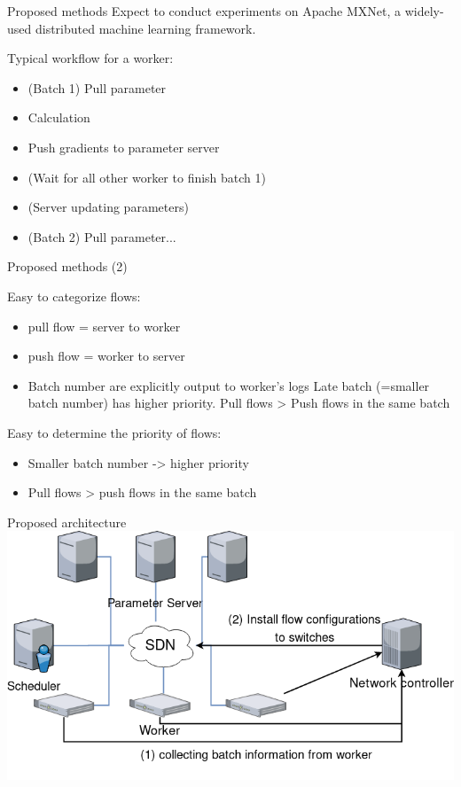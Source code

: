\documentclass{beamer}
\begin{document}
\begin{frame}{Proposed methods}
Expect to conduct experiments on Apache MXNet\footnotemark, a widely-used distributed machine learning framework.

Typical workflow for a worker:
\begin{itemize}
    \item (Batch 1) Pull parameter
    \item Calculation
    \item Push gradients to parameter server
    \item (Wait for all other worker to finish batch 1)
    \item (Server updating parameters)
    \item (Batch 2) Pull parameter...
\end{itemize}

\end{frame}

\begin{frame}{Proposed methods (2)}

Easy to categorize flows:
\begin{itemize}
    \item pull flow = server to worker
    \item push flow = worker to server
    \item Batch number are explicitly output to worker's logs
     Late batch (=smaller batch number) has higher priority. Pull flows > Push flows in the same batch
\end{itemize}

Easy to determine the priority of flows:
\begin{itemize}
    \item Smaller batch number -> higher priority
    \item Pull flows > push flows in the same batch
\end{itemize}

\end{frame}

\begin{frame}{Proposed architecture}
\centering
\includegraphics[scale=.3]{ml-sdn-arch.png}
\end{frame}
\end{document}
